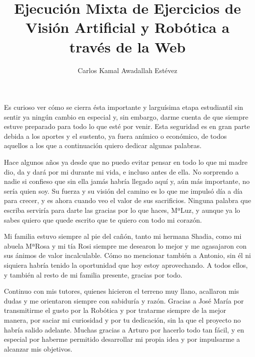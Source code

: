\documentclass[11pt,a4paper,twoside]{book}
\begin{document}
	\title{\textbf{Ejecución Mixta de Ejercicios de Visión Artificial y Robótica a través de la Web}}
	\author{Carlos Kamal Awadallah Estévez}
	 

		

    	\beforepreface

Es curioso ver cómo se cierra ésta importante y larguísima etapa estudiantil sin sentir ya ningún cambio en especial y, sin embargo, darme cuenta de que siempre estuve preparado para todo lo que esté por venir. Esta seguridad es en gran parte debida a los aportes y el sustento, ya fuera anímico o económico, de todos aquellos a los que a continuación quiero dedicar algunas palabras.

Hace algunos años ya desde que no puedo evitar pensar en todo lo que mi madre dio, da y dará por mi durante mi vida, e incluso antes de ella. No sorprendo a nadie si confieso que sin ella jamás habría llegado aquí y, aún más importante, no sería quien soy. Su fuerza y su visión del camino es lo que me impulsó día a día para crecer, y es ahora cuando veo el valor de sus sacrificios. Ninguna palabra que escriba serviría para darte las gracias por lo que haces, MªLuz, y aunque ya lo sabes quiero que quede escrito que te quiero con todo mi corazón. 

Mi familia estuvo siempre al pie del cañón, tanto mi hermana Shadia, como mi abuela MªRosa y mi tía Rosi siempre me desearon lo mejor y me agasajaron con sus ánimos de valor incalculable. Cómo no mencionar también a Antonio, sin él ni siquiera habría tenido la oportunidad que hoy estoy aprovechando. A todos ellos, y también al resto de mi familia presente, gracias por todo.

Continuo con mis tutores, quienes hicieron el terreno muy llano, acallaron mis dudas y me orientaron siempre con sabiduría y razón. Gracias a José María por transmitirme el gusto por la Robótica y por tratarme siempre de la mejor manera, por saciar mi curiosidad y por tu dedicación, sin la que el proyecto no habría salido adelante. Muchas gracias a Arturo por hacerlo todo tan fácil, y en especial por haberme permitido desarrollar mi propia idea y por impulsarme a alcanzar mis objetivos.
\end{document}

